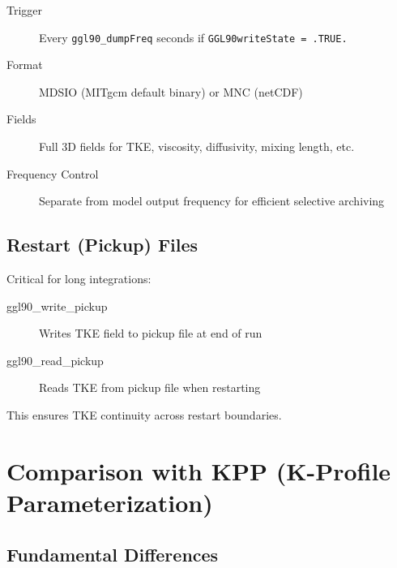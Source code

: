 \documentclass[11pt, a4paper]{article}
\begin{document}
\begin{description}
    \item[Trigger] Every \texttt{ggl90\_dumpFreq} seconds if \texttt{GGL90writeState = .TRUE.}
    \item[Format] MDSIO (MITgcm default binary) or MNC (netCDF)
    \item[Fields] Full 3D fields for TKE, viscosity, diffusivity, mixing length, etc.
    \item[Frequency Control] Separate from model output frequency for efficient selective archiving
\end{description}

\subsection{Restart (Pickup) Files}

Critical for long integrations:

\begin{description}
    \item[ggl90\_write\_pickup] Writes TKE field to pickup file at end of run
    \item[ggl90\_read\_pickup] Reads TKE from pickup file when restarting
\end{description}

This ensures TKE continuity across restart boundaries.

\section{Comparison with KPP (K-Profile Parameterization)}

\subsection{Fundamental Differences}
\end{document}
